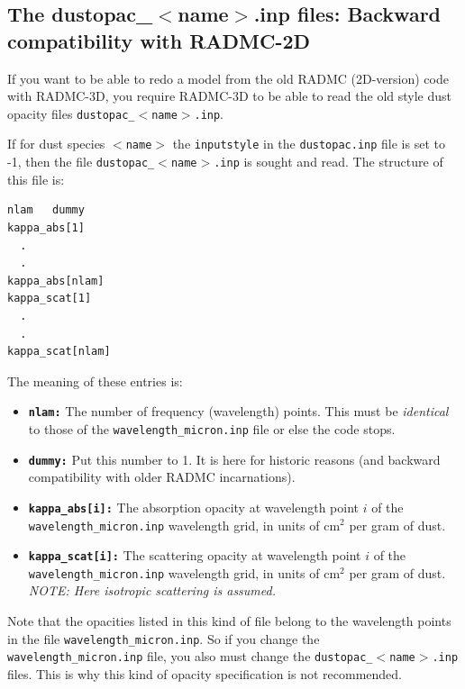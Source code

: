 \documentclass{report}
\newenvironment{asciibox}%
  {\begin{list}{}{%
    \setlength{\topsep}{0.5em}%
    \setlength{\parskip}{0em}%
    \setlength{\parsep}{0em}%
    \setlength{\itemsep}{0em}%
    \setlength{\rightmargin}{0em}%
    \setlength{\leftmargin}{3.0em}%
    \setlength{\labelsep}{1em}%
    \setlength{\labelwidth}{2em}%
  }\normalfont\footnotesize\item}
  {\end{list}}
\begin{document}
\subsection{The dustopac\_$<$name$>$.inp files: Backward compatibility with RADMC-2D}
\label{sec-dustopac-oldstyle}
If you want to be able to redo a model from the old RADMC (2D-version) code
with RADMC-3D, you require RADMC-3D to be able to read the old style 
dust opacity files {\small\tt dustopac\_$<$name$>$.inp}.

If for dust species {\small\tt $<$name$>$} the {\small\tt inputstyle} in the 
{\small\tt dustopac.inp} file is set to -1, then the file {\small\tt dustopac\_$<$name$>$.inp}
is sought and read. The structure of this file is:
\begin{asciibox}\begin{verbatim}
nlam   dummy
kappa_abs[1]
  .
  .
kappa_abs[nlam]
kappa_scat[1]
  .
  .
kappa_scat[nlam]
\end{verbatim}\end{asciibox}
The meaning of these entries is:
\begin{itemize}
\item[] {\small\tt\bf nlam:} The number of frequency (wavelength) points. This
  must be {\em identical} to those of the {\small\tt wavelength\_micron.inp} file
  or else the code stops.
\item[] {\small\tt\bf dummy:} Put this number to 1. It is here for historic
  reasons (and backward compatibility with older RADMC incarnations).
\item[] {\small\tt\bf kappa\_abs[i]:} The absorption opacity at wavelength point
  $i$ of the {\small\tt wavelength\_micron.inp} wavelength grid, in units of
  cm$^2$ per gram of dust.
\item[] {\small\tt\bf kappa\_scat[i]:} The scattering opacity at wavelength point
  $i$ of the {\small\tt wavelength\_micron.inp} wavelength grid, in units of
  cm$^2$ per gram of dust. {\em NOTE: Here isotropic scattering is assumed.}
\end{itemize}
Note that the opacities listed in this kind of file belong to the wavelength
points in the file {\small\tt wavelength\_micron.inp}. So if you change the {\small\tt
  wavelength\_micron.inp} file, you also must change the
{\small\tt dustopac\_$<$name$>$.inp} files. This is why this kind of opacity
specification is not recommended.


% 
\end{document}
